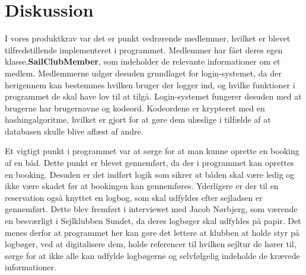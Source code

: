 \chapter{Diskussion}
I vores produktkrav var det er punkt vedrørende medlemmer, hvilket er blevet tilfredstillende implementeret i programmet. 
Medlemmer har fået deres egen klasse,\textbf{SailClubMember}, som indeholder de relevante informationer om et medlem. 
Medlemmerne udgør desuden grundlaget for login-systemet, da der herigennem kan bestemmes hvilken bruger der logger ind, og hvilke funktioner i programmet de skal have lov til at tilgå. 
Login-systemet fungerer desuden med at brugerne har brugernavne og kodeord. 
Kodeordene er krypteret med en hashingalgoritme, hvilket er gjort for at gøre dem ulæslige i tilfælde af at databasen skulle blive aflæst af andre. 

Et vigtigt punkt i programmet var at sørge for at man kunne oprette en booking af en båd. 
Dette punkt er blevet gennemført, da der i programmet kan oprettes en booking. 
Desuden er det indført logik som sikrer at båden skal være ledig og ikke være skadet før at bookingen kan gennemføres. 
Yderligere er der til en reservation også knyttet en logbog, som skal udfyldes efter sejladsen er gennemført. 
Dette blev fremført i interviewet med Jacob Nørbjerg, som værende en besværligt i Sejlklubben Sundet, da deres logbøger skal udfyldes på papir. 
Det menes derfor at programmet her kan gøre det lettere at klubben at holde styr på logbøger, ved at digitalisere dem, holde referencer til hvilken sejltur de hører til, sørge for at ikke alle kan udfylde logbøgerne og selvfølgelig indeholde de krævede informationer. 